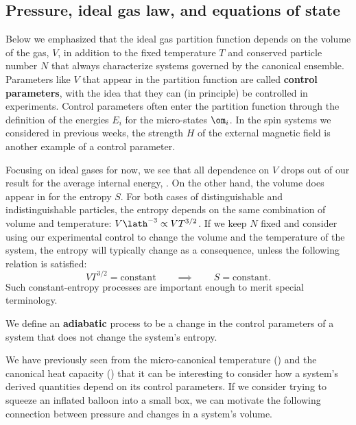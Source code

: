\subsection{\label{sec:ideal_gas}Pressure, ideal gas law, and equations of state}
Below  we emphasized that the ideal gas partition function depends on the volume of the gas, $V$, in addition to the fixed temperature $T$ and conserved particle number $N$ that always characterize systems governed by the canonical ensemble.
Parameters like $V$ that appear in the partition function are called \textbf{control parameters}, with the idea that they can (in principle) be controlled in experiments.
Control parameters often enter the partition function through the definition of the energies $E_i$ for the micro-states $\om_i$.
In the spin systems we considered in previous weeks, the strength $H$ of the external magnetic field is another example of a control parameter.

Focusing on ideal gases for now, we see that all dependence on $V$ drops out of our result for the average internal energy, .
On the other hand, the volume does appear in  for the entropy $S$.
For both cases of distinguishable and indistinguishable particles, the entropy depends on the same combination of volume and temperature: $V \lath^{-3} \propto V T^{3/2}$.
If we keep $N$ fixed and consider using our experimental control to change the volume and the temperature of the system, the entropy will typically change as a consequence, unless the following relation is satisfied:
\begin{equation*}
  V T^{3/2} = \mbox{constant} \qquad \implies \qquad S = \mbox{constant.}
\end{equation*}
Such constant-entropy processes are important enough to merit special terminology.

\begin{shaded}
  We define an \textbf{adiabatic} process to be a change in the control parameters of a system that does not change the system's entropy.
\end{shaded}

We have previously seen from the micro-canonical temperature () and the canonical heat capacity () that it can be interesting to consider how a system's derived quantities depend on its control parameters.
If we consider trying to squeeze an inflated balloon into a small box, we can motivate the following connection between pressure and changes in a system's volume.

